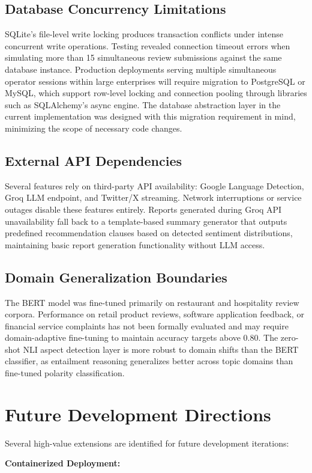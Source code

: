 \documentclass[12pt,a4paper]{report}
\begin{document}
\subsection{Database Concurrency Limitations}
SQLite's file-level write locking produces transaction conflicts under intense concurrent write operations. Testing revealed connection timeout errors when simulating more than 15 simultaneous review submissions against the same database instance. Production deployments serving multiple simultaneous operator sessions within large enterprises will require migration to PostgreSQL or MySQL, which support row-level locking and connection pooling through libraries such as SQLAlchemy's async engine. The database abstraction layer in the current implementation was designed with this migration requirement in mind, minimizing the scope of necessary code changes.

\subsection{External API Dependencies}
Several features rely on third-party API availability: Google Language Detection, Groq LLM endpoint, and Twitter/X streaming. Network interruptions or service outages disable these features entirely. Reports generated during Groq API unavailability fall back to a template-based summary generator that outputs predefined recommendation clauses based on detected sentiment distributions, maintaining basic report generation functionality without LLM access.

\subsection{Domain Generalization Boundaries}
The BERT model was fine-tuned primarily on restaurant and hospitality review corpora. Performance on retail product reviews, software application feedback, or financial service complaints has not been formally evaluated and may require domain-adaptive fine-tuning to maintain accuracy targets above 0.80. The zero-shot NLI aspect detection layer is more robust to domain shifts than the BERT classifier, as entailment reasoning generalizes better across topic domains than fine-tuned polarity classification.

\section{Future Development Directions}
Several high-value extensions are identified for future development iterations:

\textbf{Containerized Deployment:}
\end{document}
